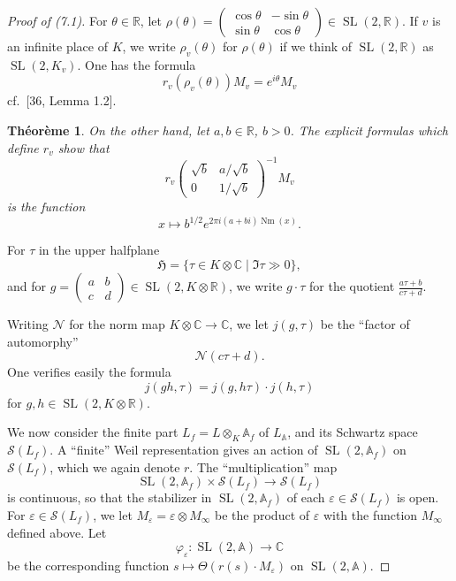 \documentclass[12pt,a4paper]{article}
\theoremstyle{plain}
\newtheorem{theorem}{Th\'{e}or\`{e}me}[section]
\theoremstyle{definition}
\theoremstyle{remark}
\newenvironment{namedtheorem}[1][]{%
  \renewcommand{\thetheorem}{#1}%
  \theoremstyle{plain}%
  \begin{theorem}%
}{\end{theorem}\renewcommand{\thetheorem}{\arabic{section}.\arabic{theorem}}}
\DeclareMathOperator{\SL}{SL}
\DeclareMathOperator{\Nm}{Nm}
\begin{document}
\begin{proof}[Proof of (7.1)]
For $\theta \in \mathbb{R}$, let $\rho(\theta) = \begin{pmatrix} \cos\theta & -\sin\theta \\ \sin\theta & \cos\theta \end{pmatrix} \in \SL(2, \mathbb{R})$. If $v$ is an infinite place of $K$, we write $\rho_v(\theta)$ for $\rho(\theta)$ if we think of $\SL(2, \mathbb{R})$ as $\SL(2, K_v)$. One has the formula
\begin{equation}\label{eq:7.2}
r_v(\rho_v(\theta)) M_v = e^{i\theta} M_v
\end{equation}
cf.~[36, Lemma 1.2].

\begin{namedtheorem}[(7.3)]
On the other hand, let $a, b \in \mathbb{R}$, $b > 0$. The explicit formulas which define $r_v$ show that
\[
r_v\begin{pmatrix} \sqrt{b} & a/\sqrt{b} \\ 0 & 1/\sqrt{b} \end{pmatrix}^{-1} M_v
\]
is the function
\[
x \mapsto b^{1/2} e^{2\pi i (a+bi) \Nm(x)}.
\]
\end{namedtheorem}

For $\tau$ in the upper halfplane
\[
\mathfrak{H} = \{\tau \in K \otimes \mathbb{C} \mid \Im\tau \gg 0\},
\]
and for $g = \begin{pmatrix} a & b \\ c & d \end{pmatrix} \in \SL(2, K \otimes \mathbb{R})$, we write $g \cdot \tau$ for the quotient $\frac{a\tau + b}{c\tau + d}$.

Writing $\mathcal{N}$ for the norm map $K \otimes \mathbb{C} \to \mathbb{C}$, we let $j(g, \tau)$ be the ``factor of automorphy''
\[
\mathcal{N}(c\tau + d).
\]
One verifies easily the formula
\begin{equation}\label{eq:7.4}
j(gh, \tau) = j(g, h\tau) \cdot j(h, \tau)
\end{equation}
for $g, h \in \SL(2, K \otimes \mathbb{R})$.

We now consider the finite part $L_f = L \otimes_K \mathbb{A}_f$ of $L_{\mathbb{A}}$, and its Schwartz space $\mathscr{S}(L_f)$. A ``finite'' Weil representation gives an action of $\SL(2, \mathbb{A}_f)$ on $\mathscr{S}(L_f)$, which we again denote $r$. The ``multiplication'' map
\[
\SL(2, \mathbb{A}_f) \times \mathscr{S}(L_f) \to \mathscr{S}(L_f)
\]
is continuous, so that the stabilizer in $\SL(2, \mathbb{A}_f)$ of each $\varepsilon \in \mathscr{S}(L_f)$ is open. For $\varepsilon \in \mathscr{S}(L_f)$, we let $M_\varepsilon = \varepsilon \otimes M_\infty$ be the product of $\varepsilon$ with the function $M_\infty$ defined above. Let
\[
\varphi_\varepsilon: \SL(2, \mathbb{A}) \to \mathbb{C}
\]
be the corresponding function $s \mapsto \Theta(r(s) \cdot M_\varepsilon)$ on $\SL(2, \mathbb{A})$.


\end{proof}
\end{document}
